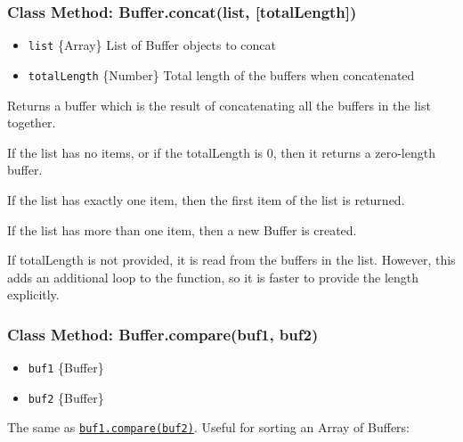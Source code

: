\subsubsection{Class Method: Buffer.concat(list,
{[}totalLength{]})}\label{class-method-buffer.concatlist-totallength}

\begin{itemize}
\itemsep1pt\parskip0pt
\item
  \texttt{list} \{Array\} List of Buffer objects to concat
\item
  \texttt{totalLength} \{Number\} Total length of the buffers when
  concatenated
\end{itemize}

Returns a buffer which is the result of concatenating all the buffers in
the list together.

If the list has no items, or if the totalLength is 0, then it returns a
zero-length buffer.

If the list has exactly one item, then the first item of the list is
returned.

If the list has more than one item, then a new Buffer is created.

If totalLength is not provided, it is read from the buffers in the list.
However, this adds an additional loop to the function, so it is faster
to provide the length explicitly.

\subsubsection{Class Method: Buffer.compare(buf1,
buf2)}\label{class-method-buffer.comparebuf1-buf2}

\begin{itemize}
\itemsep1pt\parskip0pt
\item
  \texttt{buf1} \{Buffer\}
\item
  \texttt{buf2} \{Buffer\}
\end{itemize}

The same as
\hyperref[bufferux5fbufux5fcompareux5fotherbuffer]{\texttt{buf1.compare(buf2)}}.
Useful for sorting an Array of Buffers:

\begin{Shaded}
\begin{Highlighting}[]
 \NormalTok{arr = [}\NormalTok{(}\NormalTok{), }\NormalTok{(}\NormalTok{)];}
\NormalTok{(}\NormalTok{);}
\end{Highlighting}
\end{Shaded}

